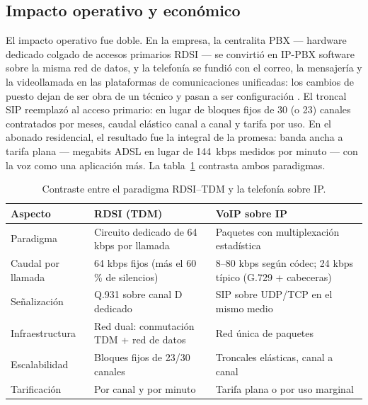 \documentclass[12pt,a4paper]{article}
\begin{document}
\subsection{Impacto operativo y económico}

El impacto operativo fue doble. En la empresa, la centralita PBX --- hardware dedicado colgado de accesos primarios RDSI --- se convirtió en IP-PBX software sobre la misma red de datos, y la telefonía se fundió con el correo, la mensajería y la videollamada en las plataformas de comunicaciones unificadas: los cambios de puesto dejan de ser obra de un técnico y pasan a ser configuración \cite{goode2002}. El troncal SIP reemplazó al acceso primario: en lugar de bloques fijos de 30 (o 23) canales contratados por meses, caudal elástico canal a canal y tarifa por uso. En el abonado residencial, el resultado fue la integral de la promesa: banda ancha a tarifa plana --- megabits ADSL en lugar de 144~kbps medidos por minuto --- con la voz como una aplicación más. La tabla~\ref{tab:comparacion} contrasta ambos paradigmas.

\begin{table}[h]
    \centering
    \small
    \begin{tabularx}{\textwidth}{l X X}
        \toprule
        \textbf{Aspecto} & \textbf{RDSI (TDM)} & \textbf{VoIP sobre IP} \\
        \midrule
        Paradigma             & Circuito dedicado de 64 kbps por llamada & Paquetes con multiplexación estadística \\
        Caudal por llamada    & 64 kbps fijos (más el 60\,\% de silencios) & 8--80 kbps según códec; 24 kbps típico (G.729 + cabeceras) \\
        Señalización          & Q.931 sobre canal D dedicado & SIP sobre UDP/TCP en el mismo medio \\
        Infraestructura       & Red dual: conmutación TDM + red de datos & Red única de paquetes \\
        Escalabilidad         & Bloques fijos de 23/30 canales & Troncales elásticas, canal a canal \\
        Tarificación          & Por canal y por minuto & Tarifa plana o por uso marginal \\
        \bottomrule
    \end{tabularx}
    \caption{Contraste entre el paradigma RDSI--TDM y la telefonía sobre IP.}
    \label{tab:comparacion}
\end{table}
\end{document}
